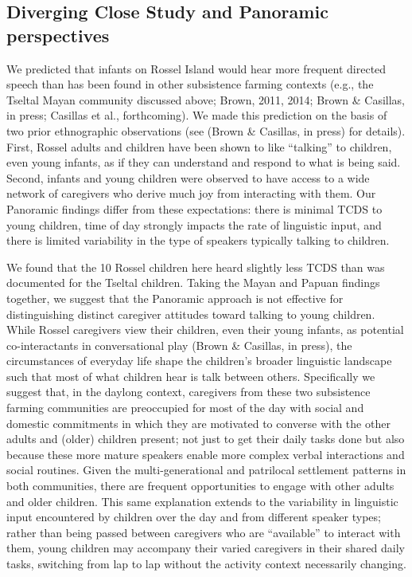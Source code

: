 \documentclass[,man,floatsintext]{apa6}
\begin{document}
\subsection{Diverging Close Study and Panoramic
perspectives}\label{diverging-close-study-and-panoramic-perspectives}

We predicted that infants on Rossel Island would hear more frequent
directed speech than has been found in other subsistence farming
contexts (e.g., the Tseltal Mayan community discussed above; Brown,
2011, 2014; Brown \& Casillas, in press; Casillas et al., forthcoming).
We made this prediction on the basis of two prior ethnographic
observations (see (Brown \& Casillas, in press) for details). First,
Rossel adults and children have been shown to like \enquote{talking} to
children, even young infants, as if they can understand and respond to
what is being said. Second, infants and young children were observed to
have access to a wide network of caregivers who derive much joy from
interacting with them. Our Panoramic findings differ from these
expectations: there is minimal TCDS to young children, time of day
strongly impacts the rate of linguistic input, and there is limited
variability in the type of speakers typically talking to children.

We found that the 10 Rossel children here heard slightly less TCDS than
was documented for the Tseltal children. Taking the Mayan and Papuan
findings together, we suggest that the Panoramic approach is not
effective for distinguishing distinct caregiver attitudes toward talking
to young children. While Rossel caregivers view their children, even
their young infants, as potential co-interactants in conversational play
(Brown \& Casillas, in press), the circumstances of everyday life shape
the children's broader linguistic landscape such that most of what
children hear is talk between others. Specifically we suggest that, in
the daylong context, caregivers from these two subsistence farming
communities are preoccupied for most of the day with social and domestic
commitments in which they are motivated to converse with the other
adults and (older) children present; not just to get their daily tasks
done but also because these more mature speakers enable more complex
verbal interactions and social routines. Given the multi-generational
and patrilocal settlement patterns in both communities, there are
frequent opportunities to engage with other adults and older children.
This same explanation extends to the variability in linguistic input
encountered by children over the day and from different speaker types;
rather than being passed between caregivers who are \enquote{available}
to interact with them, young children may accompany their varied
caregivers in their shared daily tasks, switching from lap to lap
without the activity context necessarily changing.
\end{document}
